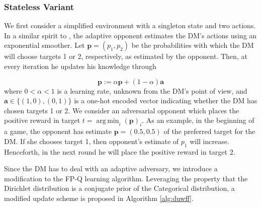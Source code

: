 \documentclass[letterpaper]{article} %
\DeclareMathOperator*{\argmax}{arg\,max}
\DeclareMathOperator*{\argmin}{arg\,min}
\begin{document}
\subsubsection{Stateless Variant}\label{sec:statv}

We first consider a simplified environment with a singleton state and two actions. In a similar spirit to \cite{leike2017ai}, the adaptive opponent estimates the DM's actions using an exponential smoother. Let $\bm{p} = (p_1, p_2)$ be the probabilities
with which the DM will choose targets 1 or 2, respectively,
as estimated by the opponent. Then, at every iteration he updates his knowledge
through 

$$
\bm{p} := \alpha \bm{p} + (1 - \alpha) \bm{a}
$$
where $0 < \alpha < 1$ is a learning rate, unknown from the DM's point of view, and $\bm{a} \in \lbrace (1, 0), (0, 1) \rbrace$ is a one-hot encoded vector indicating whether the DM has chosen targets 1 or 2. We consider an adversarial opponent which places the positive reward in target $t = \argmin_i (\bm{p})_i$.
As an example, in the beginning of a game, the opponent has estimate $\bm{p} = (0.5, 0.5)$ of the preferred target for the DM. If she chooses target 1, then opponent's estimate of $p_1$ will increase. Henceforth, in the next round he will place the positive reward in target 2.



Since the DM has to deal with an adaptive adversary, we introduce a modification to the FP-Q learning algorithm. Leveraging the property that the Dirichlet distribution is a conjugate prior of the Categorical distribution, a modified update scheme is proposed in Algorithm \ref{alg:duwff}. 
\end{document}
